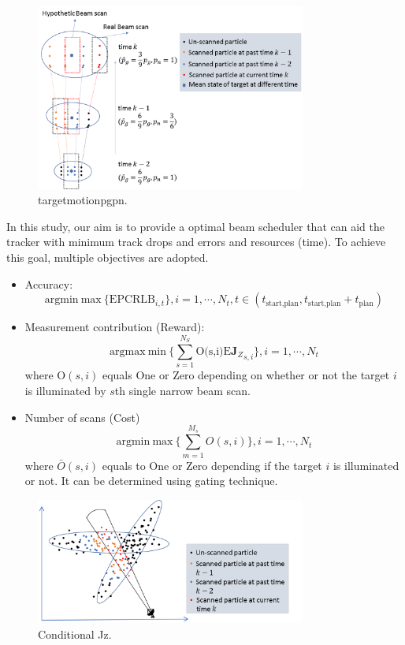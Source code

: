 \documentclass[12pt,journal,draftclsnofoot,onecolumn]{IEEEtran}
\begin{document}
\begin{figure}
	\centering
	\includegraphics[width=3.5in]{targetmotion_pg_pn.png}
	\caption{targetmotionpgpn.}
	\label{fig::targetmotion_pg_pn}
\end{figure}
In this study, our aim is to provide a optimal beam scheduler that can aid the tracker with minimum track drops and errors and resources (time). To achieve this goal, multiple objectives are adopted.
\begin{itemize}
	\item Accuracy:
	\begin{equation}
		\text{argmin}~\text{max}~ \{\text{EPCRLB}_{i,t}\}, i=1,\cdots,N_t, t\in(t_{\text{start,plan}}, t_{\text{start,plan}}+t_{\text{plan}})
		\label{eq::pcrlb_objoptimal}
	\end{equation}
	\item Measurement contribution (Reward):
	\begin{equation}
		\text{argmax}~\text{min}~ \{\sum_{s=1}^{N_S} \text{O(s,i)} {\text{E}\mathbf{J}_Z}_{s,i}\}, i=1,\cdots,N_t
		\label{eq::Jz_objoptimal}
	\end{equation}
	where $\text{O}(s,i)$ equals One or Zero depending on whether or not the target $i$ is illuminated by $s$th single narrow beam scan.
	\item Number of scans (Cost)
	\begin{equation}
		\text{argmin}~\text{max}~ \{\sum_{m=1}^{M_s}{O}(s,i)\}, i=1,\cdots,N_t 
		\label{eq::numofscans_objoptimal}
	\end{equation}
	where $\bar{O}(s,i)$ equals to One or Zero depending if the target $i$ is illuminated or not. It can be determined using gating technique.   
\end{itemize}

\begin{figure}[H]
	\centering
	\includegraphics[width=3.5in]{epcrlbparticles.png}
	\caption{Conditional Jz.}
	\label{fig::epcrlbparticles}
\end{figure}
\end{document}

